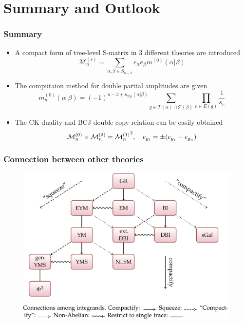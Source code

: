 \documentclass{beamer}
\begin{document}
\section{Summary and Outlook}
\begin{frame}
    \frametitle{Summary}
    \begin{itemize}
        \item A compact form of tree-level S-matrix in 3 different theories are introduced
            \begin{equation*}
                \mathcal{M}_n^{(s)}=\sum_{\alpha,\beta\in S_{n-2}}e_\alpha e_\beta m^{(0)}(\alpha|\beta)
             \end{equation*}
        \item The computaion method for double partial amplitudes are given 
            \begin{equation*}
                    m_n^{(0)}(\alpha|\beta)=(-1)^{n-3+n_{\text{flip}}(\alpha|\beta)}\sum_{g\in\mathcal{T}(\alpha)\cap\mathcal{T}(\beta)}\prod_{e\in E(g)}\frac{1}{s_e}
            \end{equation*}
        \item The CK duality and BCJ double-copy relation can be easily obtained
            \begin{equation*}
                {\cal M}^{(0)}_n\times{\cal M}^{(2)}_n={{\cal M}^{(1)}_n}^2,\quad e_{g_t}=\pm(e_{g_s}-e_{g_u})
            \end{equation*}
    \end{itemize}
\end{frame}
\begin{frame}
    \frametitle{Connection between other theories}
    \begin{figure}
        \centering
        \includegraphics[width=0.8\linewidth]{9.png}
    \end{figure}
\end{frame}
\end{document}
